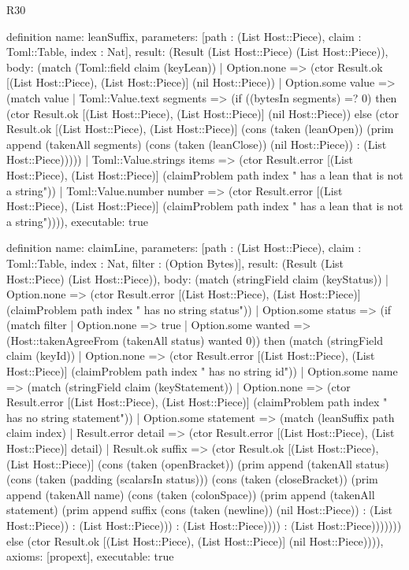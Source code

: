 \begin{lexlean}{R30}
\begin{semanticmodule}
definition{
  name: leanSuffix,
  parameters: [path : (List Host::Piece), claim : Toml::Table, index : Nat],
  result: (Result (List Host::Piece) (List Host::Piece)),
  body: (match (Toml::field claim (keyLean))
    | Option.none => (ctor Result.ok [(List Host::Piece), (List Host::Piece)] (nil Host::Piece))
    | Option.some value => (match value
      | Toml::Value.text segments => (if ((bytesIn segments) =? 0) then (ctor Result.ok [(List Host::Piece), (List Host::Piece)] (nil Host::Piece)) else (ctor Result.ok [(List Host::Piece), (List Host::Piece)] (cons (taken (leanOpen)) (prim append (takenAll segments) (cons (taken (leanClose)) (nil Host::Piece)) : (List Host::Piece)))))
      | Toml::Value.strings items => (ctor Result.error [(List Host::Piece), (List Host::Piece)] (claimProblem path index " has a lean that is not a string"))
      | Toml::Value.number number => (ctor Result.error [(List Host::Piece), (List Host::Piece)] (claimProblem path index " has a lean that is not a string")))),
  executable: true
}

definition{
  name: claimLine,
  parameters: [path : (List Host::Piece), claim : Toml::Table, index : Nat, filter : (Option Bytes)],
  result: (Result (List Host::Piece) (List Host::Piece)),
  body: (match (stringField claim (keyStatus))
    | Option.none => (ctor Result.error [(List Host::Piece), (List Host::Piece)] (claimProblem path index " has no string status"))
    | Option.some status => (if (match filter
        | Option.none => true
        | Option.some wanted => (Host::takenAgreeFrom (takenAll status) wanted 0)) then (match (stringField claim (keyId))
      | Option.none => (ctor Result.error [(List Host::Piece), (List Host::Piece)] (claimProblem path index " has no string id"))
      | Option.some name => (match (stringField claim (keyStatement))
        | Option.none => (ctor Result.error [(List Host::Piece), (List Host::Piece)] (claimProblem path index " has no string statement"))
        | Option.some statement => (match (leanSuffix path claim index)
          | Result.error detail => (ctor Result.error [(List Host::Piece), (List Host::Piece)] detail)
          | Result.ok suffix => (ctor Result.ok [(List Host::Piece), (List Host::Piece)] (cons (taken (openBracket)) (prim append (takenAll status) (cons (taken (padding (scalarsIn status))) (cons (taken (closeBracket)) (prim append (takenAll name) (cons (taken (colonSpace)) (prim append (takenAll statement) (prim append suffix (cons (taken (newline)) (nil Host::Piece)) : (List Host::Piece)) : (List Host::Piece))) : (List Host::Piece)))) : (List Host::Piece))))))) else (ctor Result.ok [(List Host::Piece), (List Host::Piece)] (nil Host::Piece)))),
  axioms: [propext],
  executable: true
}


\end{semanticmodule}
\end{lexlean}
